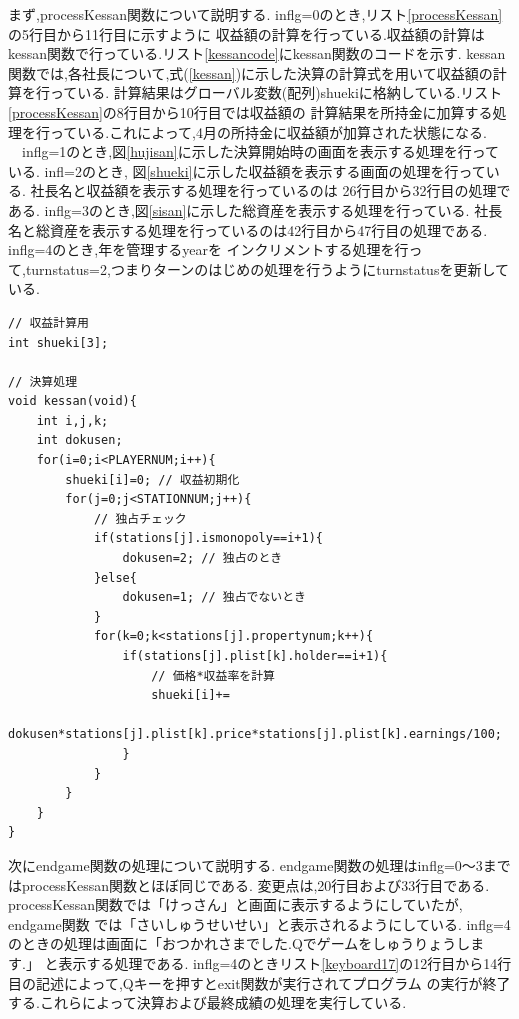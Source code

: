 \documentclass[a4j]{jarticle}
\begin{document}
        まず,processKessan関数について説明する. inflg=0のとき,リスト\ref{processKessan}の5行目から11行目に示すように
        収益額の計算を行っている.収益額の計算はkessan関数で行っている.リスト\ref{kessancode}にkessan関数のコードを示す.
        kessan関数では,各社長について,式(\ref{kessan})に示した決算の計算式を用いて収益額の計算を行っている.
        計算結果はグローバル変数(配列)shuekiに格納している.リスト\ref{processKessan}の8行目から10行目では収益額の
        計算結果を所持金に加算する処理を行っている.これによって,4月の所持金に収益額が加算された状態になる.\\
        　inflg=1のとき,図\ref{hujisan}に示した決算開始時の画面を表示する処理を行っている. infl=2のとき,
        図\ref{shueki}に示した収益額を表示する画面の処理を行っている. 社長名と収益額を表示する処理を行っているのは
        26行目から32行目の処理である. inflg=3のとき,図\ref{sisan}に示した総資産を表示する処理を行っている.
        社長名と総資産を表示する処理を行っているのは42行目から47行目の処理である. inflg=4のとき,年を管理するyearを
        インクリメントする処理を行って,turnstatus=2,つまりターンのはじめの処理を行うようにturnstatusを更新している.
        \begin{lstlisting}[basicstyle=\ttfamily\footnotesize, frame=single,label=kessancode,caption=kessan関数]
// 収益計算用
int shueki[3];

// 決算処理
void kessan(void){
    int i,j,k;
    int dokusen;
    for(i=0;i<PLAYERNUM;i++){
        shueki[i]=0; // 収益初期化
        for(j=0;j<STATIONNUM;j++){
            // 独占チェック
            if(stations[j].ismonopoly==i+1){
                dokusen=2; // 独占のとき
            }else{
                dokusen=1; // 独占でないとき
            }
            for(k=0;k<stations[j].propertynum;k++){
                if(stations[j].plist[k].holder==i+1){
                    // 価格*収益率を計算
                    shueki[i]+=
                    dokusen*stations[j].plist[k].price*stations[j].plist[k].earnings/100;
                }
            }
        }
    }
}
        \end{lstlisting}

        次にendgame関数の処理について説明する. endgame関数の処理はinflg=0～3まではprocessKessan関数とほぼ同じである.
        変更点は,20行目および33行目である. processKessan関数では「けっさん」と画面に表示するようにしていたが, endgame関数
        では「さいしゅうせいせい」と表示されるようにしている. inflg=4のときの処理は画面に「おつかれさまでした.Qでゲームをしゅうりょうします.」
        と表示する処理である. inflg=4のときリスト\ref{keyboard17}の12行目から14行目の記述によって,Qキーを押すとexit関数が実行されてプログラム
        の実行が終了する.これらによって決算および最終成績の処理を実行している.
\end{document}
